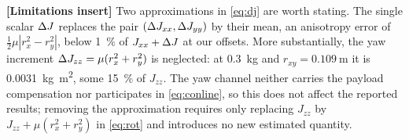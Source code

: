 \documentclass[conference]{IEEEtran}
\begin{document}
\textbf{[Limitations insert]} Two approximations in \eqref{eq:dj} are worth stating. The
single scalar $\Delta J$ replaces the pair $(\Delta J_{xx}, \Delta J_{yy})$ by their mean, an anisotropy
error of $\tfrac12 \mu |r_x^2 - r_y^2|$, below \SI{1}{\percent} of $J_{xx}+\Delta J$ at our offsets.
More substantially, the yaw increment $\Delta J_{zz} = \mu(r_x^2 + r_y^2)$ is neglected: at
\SI{0.3}{\kg} and $r_{xy} = \SI{0.109}{\meter}$ it is \SI{0.0031}{\kg\meter\squared}, some
\SI{15}{\percent} of $J_{zz}$. The yaw channel neither carries the payload compensation nor
participates in \eqref{eq:conline}, so this does not affect the reported results; removing the
approximation requires only replacing $J_{zz}$ by $J_{zz} + \mu(r_x^2+r_y^2)$ in
\eqref{eq:rot} and introduces no new estimated quantity.
\end{document}
